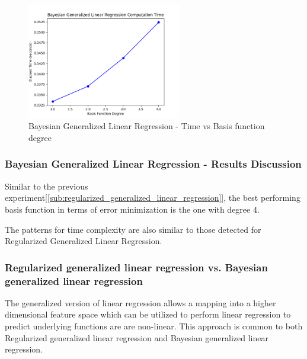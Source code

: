 \documentclass[parskip=full]{scrartcl}
\begin{document}
        \begin{figure}[ht]
            \centering
            \includegraphics[width=0.6\textwidth]{3b_degree_vs_time.png}
            \caption{Bayesian Generalized Linear Regression - Time vs Basis function degree}
            \label{fig:bglg_time_v_deg}
        \end{figure}

        \subsubsection*{Bayesian Generalized Linear Regression - Results Discussion} %
        \label{ssub:bayesian_generalized_linear_regression_results_discussion}

            Similar to the previous experiment[\ref{sub:regularized_generalized_linear_regression}], the best performing basis function in terms of error minimization is the one with degree 4.

            The patterns for time complexity are also similar to those detected for Regularized Generalized Linear Regression. 
        

        \subsubsection*{Regularized generalized linear regression vs. Bayesian generalized linear regression} %
        \label{ssub:regularized_generalized_linear_regression_vs_bayesian_generalized_linear_regression}

            The generalized version of linear regression allows a mapping into a higher dimensional feature space which can be utilized to perform linear regression to predict underlying functions are are non-linear. This approach is common to both Regularized generalized linear regression and Bayesian generalized linear regression.
\end{document}
